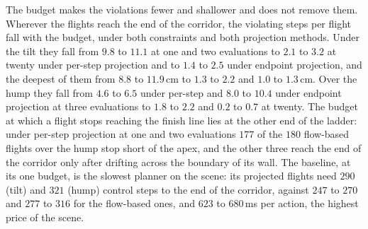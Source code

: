 The budget makes the violations fewer and shallower and does not remove them. Wherever the flights reach
the end of the corridor, the violating steps per flight fall with the budget, under both constraints and
both projection methods. Under the tilt they fall from $9.8$ to $11.1$ at one and two evaluations to $2.1$
to $3.2$ at twenty under per-step projection and to $1.4$ to $2.5$ under endpoint projection, and the
deepest of them from $8.8$ to $11.9$\,cm to $1.3$ to $2.2$ and $1.0$ to $1.3$\,cm. Over the hump they fall
from $4.6$ to $6.5$ under per-step and $8.0$ to $10.4$ under endpoint projection at three evaluations to
$1.8$ to $2.2$ and $0.2$ to $0.7$ at twenty. The budget at which a flight stops reaching the finish line lies
at the other end of the ladder: under per-step projection at one and two evaluations $177$ of the $180$
flow-based flights over the hump stop short of the apex, and the other three reach the end of the corridor
only after drifting across the boundary of its wall. The baseline, at its one budget, is the slowest
planner on the scene: its projected flights need $290$ (tilt) and $321$ (hump) control steps to the end of
the corridor, against $247$ to $270$ and $277$ to $316$ for the flow-based ones, and $623$ to $680$\,ms
per action, the highest price of the scene.

